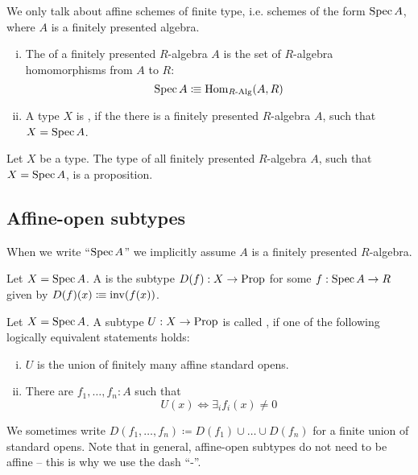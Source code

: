 We only talk about affine schemes of finite type, i.e. schemes of the form $\operatorname{Spec} A$,
where $A$ is a finitely presented algebra.

\begin{definition}%
  \begin{enumerate}[(i)]
  \item
    The  of a finitely presented $R$-algebra $A$
    is the set of $R$-algebra homomorphisms from $A$ to $R$:
    \[ \operatorname{Spec} A \vcentcolon\mspace{-1.2mu}\equiv \mathrm{Hom}_{R\text{-}\mathrm{Alg}}(A, R) \]
  \item
    A type $X$ is ,
    if the there is a finitely presented $R$-algebra $A$, such that $X=\operatorname{Spec} A$.
  \end{enumerate}
\end{definition}

\begin{proposition}%
  Let $X$ be a type.
  The type of all finitely presented $R$-algebra $A$, such that $X=\operatorname{Spec} A$, is a proposition.
\end{proposition}

\subsection{Affine-open subtypes}

When we write ``$\operatorname{Spec} A$'' we implicitly assume $A$ is a finitely presented $R$-algebra.

\begin{definition}%
  Let $X=\operatorname{Spec} A$.
  A  is the subtype $D(f):X\to\mathrm{Prop}$
  for some $f:\operatorname{Spec} A\to R$ given by $D(f)(x)\vcentcolon\mspace{-1.2mu}\equiv \mathrm{inv}(f(x))$.
\end{definition}

\begin{definition}%
  \label{affine-open}
  Let $X=\operatorname{Spec} A$.
  A subtype $U:X\to\mathrm{Prop}$ is called ,
  if one of the following logically equivalent statements holds:
  \begin{enumerate}[(i)]%
  \item $U$ is the union of finitely many affine standard opens.
  \item There are $f_1,\dots,f_n:A$ such that
    \[U(x) \Leftrightarrow \exists_{i} f_i(x)\neq 0 \]
  \end{enumerate}
\end{definition}

We sometimes write $D(f_1, \dots, f_n) \coloneq D(f_1) \cup \dots \cup D(f_n)$
for a finite union of standard opens.
Note that in general, affine-open subtypes do not need to be affine
-- this is why we use the dash ``-''.

